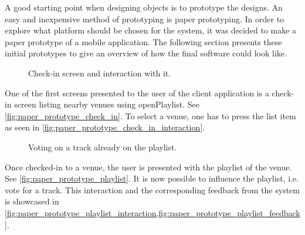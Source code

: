 \label{paper_prototype}
A good starting point when designing objects is to prototype the
designs. An easy and inexpensive method of prototyping is paper
prototyping. In order to explore what platform should be chosen for the system, it was decided to make a paper prototype of a mobile application. The following section presents these initial prototypes to give an overview of how the final software could look like.

\begin{figure}[H]
  \centering
  \caption{Check-in screen and interaction with it.}
\end{figure}

One of the first screens presented to the user of the client
application is a check-in screen listing nearby venues using
openPlaylist. See \cref{fig:paper_prototype_check_in}. To select a
venue, one has to press the list item as seen in \cref{fig:paper_prototype_check_in_interaction}.

\begin{figure}[H]
  \centering
  \caption{Voting on a track already on the playlist.}
\end{figure}

Once checked-in to a venue, the user is presented with the playlist of
the venue. See \cref{fig:paper_prototype_playlist}. It is now possible
to influence the playlist, i.e. vote for a track. This
interaction and the corresponding feedback from the system is showcased in
\cref{fig:paper_prototype_playlist_interaction,fig:paper_prototype_playlist_feedback}.

